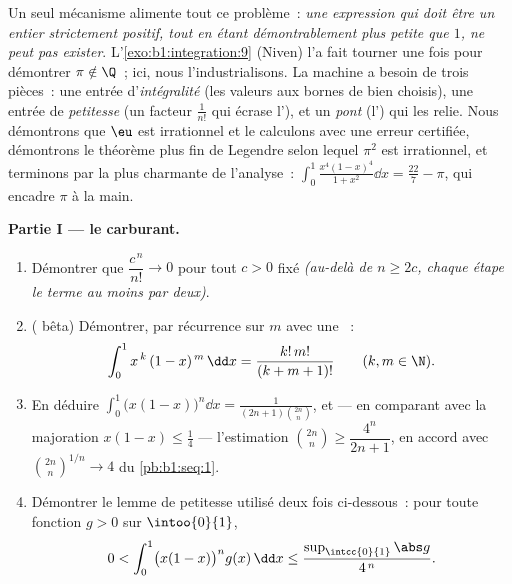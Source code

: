 \begin{problem}
\label{pb:b1:integration:1}
Un seul mécanisme alimente tout ce problème~: \emph{une expression
qui doit être un entier strictement positif, tout en étant
démontrablement plus petite que $1$, ne peut pas exister}.
L'\cref{exo:b1:integration:9} (Niven) l'a fait tourner une fois pour
démontrer $\pi \notin \Q$~; ici, nous l'industrialisons. La machine
a besoin de trois pièces~: une entrée d'\emph{intégralité} (les
valeurs aux bornes de  bien choisis), une entrée de
\emph{petitesse} (un facteur $\frac{1}{n!}$ qui écrase l'),
et un \emph{pont} (l') qui les relie. Nous
démontrons que $\eu$ est irrationnel et le calculons avec une erreur
certifiée, démontrons le théorème plus fin de Legendre selon lequel
$\pi^2$ est irrationnel, et terminons par la plus charmante
 de l'analyse~: $\int_0^1 \frac{x^4(1 - x)^4}{1 + x^2}\dd x
= \frac{22}{7} - \pi$, qui encadre $\pi$ à la
main.

\medskip
\noindent\textbf{Partie I --- le carburant.}
\begin{enumerate}
  \item Démontrer que $\dfrac{c^{\,n}}{n!} \to 0$ pour tout $c > 0$
        fixé \emph{(au-delà de $n \geq 2c$, chaque étape  le
        terme au moins par deux)}.
  \item ( bêta) Démontrer, par récurrence sur $m$ avec une
        ~:
        \[
        \int_0^1 x^{\,k}\,(1 - x)^{\,m}\,\dd x =
        \frac{k!\,m!}{(k + m + 1)!}
        \qquad (k, m \in \N).
        \]
  \item En déduire $\displaystyle\int_0^1 \bigl(x(1-x)\bigr)^n \dd x
        = \frac{1}{(2n+1)\binom{2n}{n}}$, et --- en comparant avec
        la majoration $x(1 - x) \leq \frac14$ --- l'estimation
        $\binom{2n}{n} \geq \dfrac{4^n}{2n+1}$, en accord avec
        $\binom{2n}{n}^{1/n} \to 4$ du \cref{pb:b1:seq:1}.
  \item Démontrer le lemme de petitesse utilisé deux fois
        ci-dessous~: pour toute fonction  $g > 0$ sur
        $\intoo{0}{1}$,
        \[
        0 < \int_0^1 \bigl(x(1-x)\bigr)^n g(x)\,\dd x
        \leq \frac{\sup_{\intcc{0}{1}}\abs g}{4^{\,n}} .
        \]
\end{enumerate}


\end{problem}
